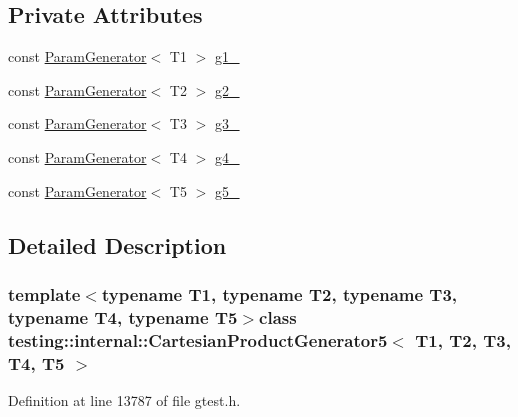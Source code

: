 \subsection*{\-Private \-Attributes}
\begin{DoxyCompactItemize}
\item 
const \hyperlink{classtesting_1_1internal_1_1ParamGenerator}{\-Param\-Generator}$<$ \-T1 $>$ \hyperlink{classtesting_1_1internal_1_1CartesianProductGenerator5_a315f81360fc67b016cbf514cb78c1975}{g1\-\_\-}
\item 
const \hyperlink{classtesting_1_1internal_1_1ParamGenerator}{\-Param\-Generator}$<$ \-T2 $>$ \hyperlink{classtesting_1_1internal_1_1CartesianProductGenerator5_a4bd40d1fbb8c6d2895b5201e62afbe38}{g2\-\_\-}
\item 
const \hyperlink{classtesting_1_1internal_1_1ParamGenerator}{\-Param\-Generator}$<$ \-T3 $>$ \hyperlink{classtesting_1_1internal_1_1CartesianProductGenerator5_acda98d4bf8f619856fb2e0ec015b9bc8}{g3\-\_\-}
\item 
const \hyperlink{classtesting_1_1internal_1_1ParamGenerator}{\-Param\-Generator}$<$ \-T4 $>$ \hyperlink{classtesting_1_1internal_1_1CartesianProductGenerator5_a1b3cef374aa9be9fbd4ed12caa7db9b5}{g4\-\_\-}
\item 
const \hyperlink{classtesting_1_1internal_1_1ParamGenerator}{\-Param\-Generator}$<$ \-T5 $>$ \hyperlink{classtesting_1_1internal_1_1CartesianProductGenerator5_a938d8dc16afe9878a43d89ce3cd87ad7}{g5\-\_\-}
\end{DoxyCompactItemize}


\subsection{\-Detailed \-Description}
\subsubsection*{template$<$typename T1, typename T2, typename T3, typename T4, typename T5$>$class testing\-::internal\-::\-Cartesian\-Product\-Generator5$<$ T1, T2, T3, T4, T5 $>$}



\-Definition at line 13787 of file gtest.\-h.



